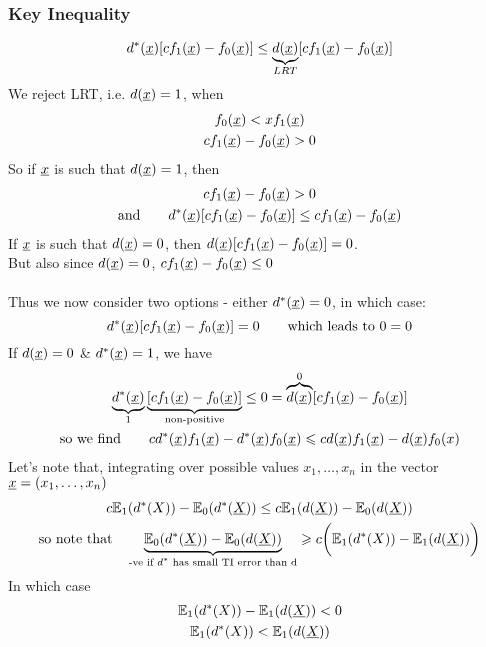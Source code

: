 \subsubsection*{Key Inequality}
\begin{equation*}
	d^*(\underline{x}) [cf_1(\underline{x}) - f_0(\underline{x})] \leq \underbrace{d(\underline{x})}_{LRT}[cf_1(\underline{x}) - f_0(\underline{x})]
\end{equation*}
We reject LRT, i.e. $d(\underline{x}) = 1$, when 
\begin{gather*}
	f_0(\underline{x}) < xf_1(\underline{x})\\
	cf_1(\underline{x}) - f_0(\underline{x}) > 0
\end{gather*}
So if $\underline{x}$ is such that $d(\underline{x}) = 1$, then 	
\begin{gather*}
	 cf_1(\underline{x}) - f_0(\underline{x}) > 0\\
	 \text{and} \qquad d^*(\underline{x}) [cf_1(\underline{x}) - f_0(\underline{x})] \leq cf_1(\underline{x}) - f_0(\underline{x})
\end{gather*}
If $\underline{x}$ is such that $d(\underline{x}) = 0$, \quad then $d(\underline{x}) [cf_1(\underline{x}) - f_0(\underline{x})] = 0$.\\ But also since $d(\underline{x}) = 0$, \quad $cf_1(\underline{x}) - f_0(\underline{x}) \leq 0$\\\\
Thus we now consider two options - either $d^*(\underline{x}) = 0$, in which case:
\begin{equation*}
	d^*(\underline{x})[cf_1(\underline{x}) - f_0(\underline{x})] = 0 \qquad \text{which leads to $0 = 0$}
\end{equation*}
If $d(\underline{x}) = 0$ \&  $d^*(\underline{x}) = 1$, we have
\begin{gather*}
	\underbrace{d^*(\underline{x})}_{1} \underbrace{[cf_1(\underline{x}) - f_0(\underline{x})]}_{\text{non-positive}} \leq 0 = \overbrace{d(\underline{x})}^{0} [cf_1(\underline{x}) - f_0(\underline{x})]\\
	\text{so we find} \qquad cd^*(\underline{x}) f_1(\underline{x}) - d^*(\underline{x}) f_0(\underline{x}) \leqslant cd(\underline{x}) f_1(\underline{x}) - d(\underline{x})f_0(x)
\end{gather*}
Let's note that, integrating over possible values $x_1, \ldots, x_n$ in the vector $\underline{x} = (x_1, \ldots, x_n)$
\begin{gather*}
	c\mathbb{E}_1 (d^*(X)) - \mathbb{E}_0 (d^*(\underline{X})) \leq c \mathbb{E}_1(d(\underline{X})) - \mathbb{E}_0(d(\underline{X}))\\
	\text{so note that} \quad \underbrace{\mathbb{E}_0 (d^*(\underline{X})) - \mathbb{E}_0(d(\underline{X}))}_{\text{-ve if $d^*$ has small TI error than d}} \geqslant c\bigg(\mathbb{E}_1 (d^*(X)) - \mathbb{E}_1(d(\underline{X})) \bigg)
\end{gather*}
In which case
\begin{gather*}
	\mathbb{E}_1 (d^*(X)) - \mathbb{E}_1(d(\underline{X})) < 0\\
	\mathbb{E}_1 (d^*(X)) < \mathbb{E}_1(d(\underline{X}))
\end{gather*}
